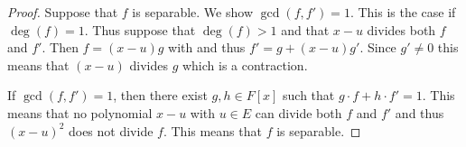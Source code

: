 \begin{proof}
  Suppose that $f$ is separable. We show $\gcd(f,f') = 1$. This is the case if $\deg(f)=1$.  Thus suppose that $\deg(f)>1$ and that  $x-u$ divides both $f$ and $f'$. Then $f = (x-u) g$ with and thus $f'= g + (x-u) g'$. Since $g' ≠0$ this means that $(x-u)$ divides $g$ which is a contraction.

  If $\gcd(f,f') = 1$, then there exist $g,h∈ F[x]$ such that $g ⋅ f + h ⋅f'=1$. This means that no polynomial $x-u$ with $u ∈E$ can divide both $f$ and $f'$ and thus $(x-u)^2$ does not divide $f$. This means that  $f$ is separable.
\end{proof}

